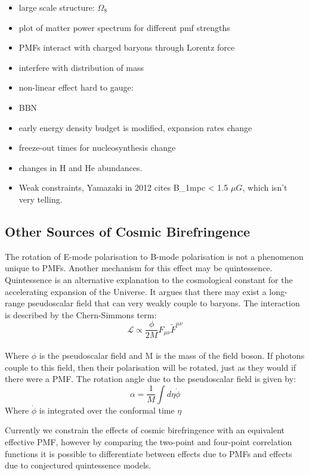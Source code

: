 \begin{itemize}
\item large scale structure: $\Omega_8$
\item plot of matter power spectrum for different pmf strengths
\item PMFs interact with charged baryons through Lorentz force
\item interfere with distribution of mass
\item non-linear effect hard to gauge:

\item BBN
\item early energy density budget is modified, expansion rates change
\item freeze-out times for nucleosynthesis change
\item changes in H and He abundances.
\item Weak constraints, Yamazaki in 2012 cites B_1mpc < 1.5 $\mu G$, which isn't very telling.
\end{itemize}



\subsection{Other Sources of Cosmic Birefringence}
The rotation of E-mode polarisation to B-mode polarisation is not a phenomenon unique to PMFs. Another mechanism for this effect may be quintessence. Quintessence is an alternative explanation to the cosmological constant for the accelerating expansion of the Universe. It argues that there may exist a long-range pseudoscalar field that can very weakly couple to baryons. The interaction is described by the Chern-Simmons term:
\begin{equation}
\mathcal{L} \propto \frac{\phi}{2M}F_{\mu \nu}\tilde{F}^{\mu \nu}
\end{equation}
\\
Where $\phi$ is the pseudoscalar field and M is the mass of the field boson. If photons couple to this field, then their polarisation will be rotated, just as they would if there were a PMF. The rotation angle due to the pseudoscalar field is given by:
\begin{equation}
\alpha = \frac{1}{M} \int{d\eta \dot{\phi}}
\end{equation}
Where $\dot{\phi}$ is integrated over the conformal time $\eta$

Currently we constrain the effects of cosmic birefringence with an equivalent effective PMF, however by comparing the two-point and four-point correlation functions it is possible to differentiate between effects due to PMFs and effects due to conjectured quintessence models. \cite{Ade:2015cao}




